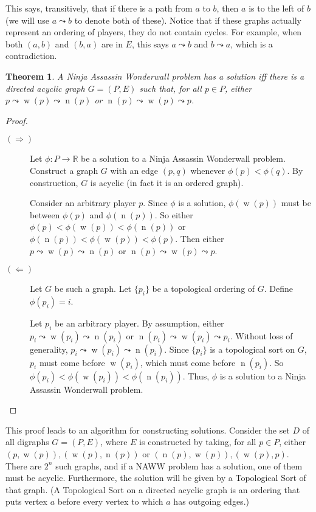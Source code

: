 \documentclass[12pt,x11names, rgb]{article}
\newtheorem*{thm}{Theorem}
\DeclareMathOperator{\w}{w}
\DeclareMathOperator{\n}{n}
\begin{document}
    This says, transitively, that if there is a path from $a$ to $b$, then $a$ is to the left of $b$ (we will use $a \leadsto b$ to denote both of these). Notice that if these graphs actually represent an ordering of players, they do not contain cycles. For example, when both $(a,b)$ and $(b,a)$ are in $E$, this says $a \leadsto b$ and $b \leadsto a$, which is a contradiction. 

    \begin{thm}
    A Ninja Assassin Wonderwall problem has a solution iff there is a directed acyclic graph $G=(P,E)$ such that, for all $p\in P$, either  $p \leadsto \w(p) \leadsto \n(p)$ or $\n(p) \leadsto \w(p) \leadsto p$.
    \end{thm}
    \begin{proof} \mbox{}

    \begin{description}
    \item[$(\Rightarrow)$] Let $\phi: P \to \mathbb{R}$ be a solution to a Ninja Assassin Wonderwall problem. Construct a graph $G$ with an edge $(p,q)$ whenever $\phi(p)<\phi(q)$. By construction, $G$ is acyclic (in fact it is an ordered graph).

    Consider an arbitrary player $p$. Since $\phi$ is a solution, $\phi(\w(p))$ must be between $\phi(p)$ and $\phi(\n(p))$. So either $\phi(p) < \phi(\w(p)) < \phi(\n(p))$ or $\phi(\n(p)) < \phi(\w(p)) < \phi(p)$. Then either $p \leadsto \w(p) \leadsto \n(p)$ or $\n(p) \leadsto \w(p) \leadsto p$.

    \item[$(\Leftarrow)$] Let $G$ be such a graph. Let $\{p_i\}$ be a topological ordering of $G$. Define $\phi(p_i) = i$. 

    Let $p_i$ be an arbitrary player. By assumption, either $p_i \leadsto \w(p_i) \leadsto \n(p_i)$ or $\n(p_i) \leadsto \w(p_i) \leadsto p_i$. Without loss of generality, $p_i \leadsto \w(p_i) \leadsto \n(p_i)$. Since $\{p_i\}$ is a topological sort on $G$, $p_i$ must come before $\w(p_i)$, which must come before $\n(p_i)$. So $\phi(p_i) < \phi(\w(p_i)) < \phi(\n(p_i))$. Thus, $\phi$ is a solution to a Ninja Assassin Wonderwall problem.
    \end{description}
    \end{proof}

    This proof leads to an algorithm for constructing solutions. Consider the set $D$ of all digraphs $G=(P,E)$, where $E$ is constructed by taking, for all $p \in P$, either  $(p,\w(p)), (\w(p),\n(p))$ or $(\n(p),\w(p)),(\w(p),p)$. There are $2^n$ such graphs, and if a NAWW problem has a solution, one of them must be acyclic. Furthermore, the solution will be given by a Topological Sort of that graph. (A Topological Sort on a directed acyclic graph is an ordering that puts vertex $a$ before every vertex to which $a$ has outgoing edges.)
\end{document}
